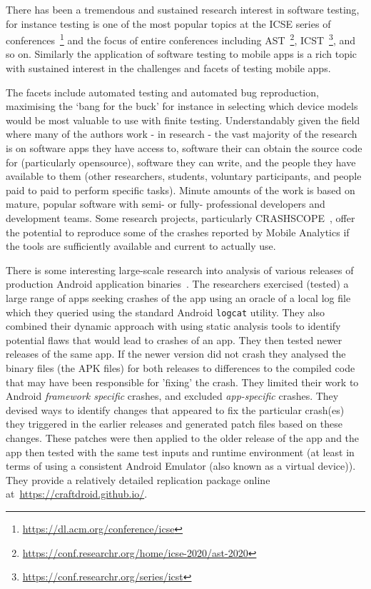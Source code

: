 There has been a tremendous and sustained research interest in software testing, for instance testing is one of the most popular topics at the ICSE series of conferences~\footnote{\url{https://dl.acm.org/conference/icse}} and the focus of entire conferences including AST~\footnote{\url{https://conf.researchr.org/home/icse-2020/ast-2020}}, ICST~\footnote{\url{https://conf.researchr.org/series/icst}}, and so on. Similarly the application of software testing to mobile apps is a rich topic with sustained interest in the challenges and facets of testing mobile apps.

The facets include automated testing and automated bug reproduction, maximising the `bang for the buck' for instance in selecting which device models would be most valuable to use with finite testing. Understandably given the field where many of the authors work - in research - the vast majority of the research is on software apps they have access to, software their can obtain the source code for (particularly opensource), software they can write, and the people they have available to them (other researchers, students, voluntary participants, and people paid to paid to perform specific tasks). Minute amounts of the work is based on mature, popular software with semi- or fully- professional developers and development teams. Some research projects, particularly CRASHSCOPE~\citep{moran2016_automatically_drr_android_app_crashes}, offer the potential to reproduce some of the crashes reported by Mobile Analytics if the tools are sufficiently available and current to actually use.



There is some interesting large-scale research into analysis of various releases of production Android application binaries~\citep{kong2019_mining_android_crash_fixes}. The researchers exercised (tested) a large range of apps seeking crashes of the app using an oracle of a local log file which they queried using the standard Android \texttt{logcat} utility. They also combined their dynamic approach with using static analysis tools to identify potential flaws that would lead to crashes of an app. They then tested newer releases of the same app. If the newer version did not crash they analysed the binary files (the APK files) for both releases to differences to the compiled code that may have been responsible for 'fixing' the crash. They limited their work to Android \emph{framework specific} crashes, and excluded \emph{app-specific} crashes. They devised ways to identify changes that appeared to fix the particular crash(es) they triggered in the earlier releases and generated patch files based on these changes. These patches were then applied to the older release of the app and the app then tested with the same test inputs and runtime environment (at least in terms of using a consistent Android Emulator (also known as a virtual device)). They provide a relatively detailed replication package online at~\url{https://craftdroid.github.io/}.

